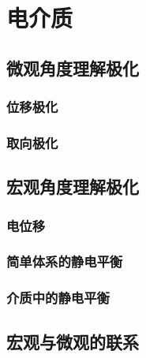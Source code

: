 

\section{电介质}\label{16-3}

\subsection{微观角度理解极化}\label{16-3-1}

\subsubsection{位移极化}\label{16-3-1-1}

\subsubsection{取向极化}\label{16-3-1-2}

\subsection{宏观角度理解极化}\label{16-3-2}

\subsubsection{电位移}\label{16-3-2-1}

\subsubsection{简单体系的静电平衡}\label{16-3-2-2}

\subsubsection{介质中的静电平衡}\label{16-3-2-3}

\subsection{宏观与微观的联系}\label{16-3-3}